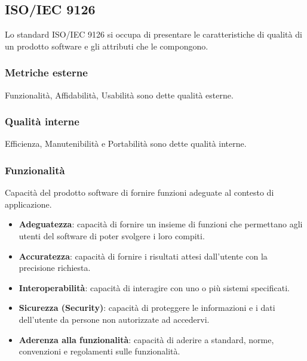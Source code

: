 \subsection{ISO/IEC 9126}
Lo standard ISO/IEC 9126 si occupa di presentare le caratteristiche di qualità di un prodotto software e gli attributi che le compongono.

\subsubsection{Metriche esterne}
Funzionalità, Affidabilità, Usabilità sono dette qualità esterne.
\subsubsection{Qualità interne}
Efficienza, Manutenibilità e Portabilità sono dette qualità interne.

\subsubsection{Funzionalità}
Capacità del prodotto software di fornire funzioni adeguate al contesto di applicazione.
\begin{itemize}
\item \textbf{Adeguatezza}: capacità di fornire un insieme di funzioni che permettano agli utenti del software di poter svolgere i loro compiti.
\item \textbf{Accuratezza}: capacità di fornire i risultati attesi dall’utente con la precisione richiesta.
\item \textbf{Interoperabilità}: capacità di interagire con uno o più sistemi specificati.
\item \textbf{Sicurezza (Security)}: capacità di proteggere le informazioni e i dati dell’utente da persone non autorizzate ad accedervi.
\item \textbf{Aderenza alla funzionalità}: capacità di aderire a standard, norme, convenzioni e regolamenti sulle funzionalità.
\end{itemize}

